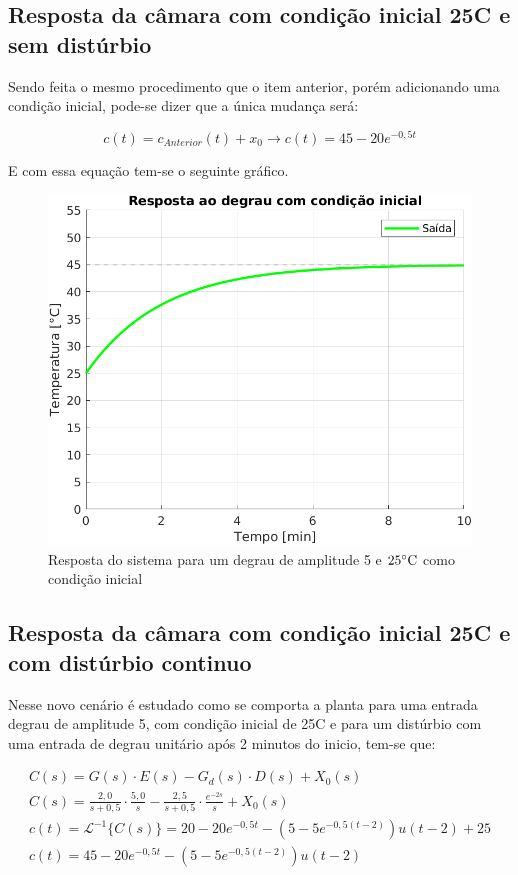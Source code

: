 \documentclass[a4paper,12pt]{article}
\begin{document}
	\subsection{Resposta da câmara com condição inicial 25\degree C e sem distúrbio}
		Sendo feita o mesmo procedimento que o item anterior, porém adicionando uma condição inicial, pode-se dizer que a única mudança será:
		
		\begin{equation}
			c(t) = c_{Anterior}(t) + x_0 \rightarrow c(t) = 45 - 20e^{-0,5t}
		\end{equation}
	
		E com essa equação tem-se o seguinte gráfico.
		
		\begin{figure}[H]
			\centering
			\includegraphics[width=0.5\linewidth]{images/respc.png}
			\caption{Resposta do sistema para um degrau de amplitude 5 e $25 \celsius$ como condição inicial}
			\label{fig:resposta_c}
		\end{figure}
	
	\subsection{Resposta da câmara com condição inicial 25\degree C e com distúrbio continuo}
		Nesse novo cenário é estudado como se comporta a planta para uma entrada degrau de amplitude 5, com condição inicial de 25\degree C e para um distúrbio com uma entrada de degrau unitário após 2 minutos do inicio, tem-se que:
		
		\begin{gather}
			C(s) = G(s) \cdot E(s) - G_d(s) \cdot D(s)  + X_0(s)\\[20pt]
			C(s) = \frac{2,0}{s+0,5} \cdot \frac{5,0}{s} - \frac{2,5}{s+0,5} \cdot \frac{e^{-2s}}{s} + X_0(s) \\[20pt]
			c(t) = \mathcal{L}^{-1} \{ C(s) \} = 20 - 20e^{-0,5t} - (5 - 5e^{-0,5(t-2)})u(t-2) + 25 \\[20pt]
			c(t) = 45 - 20e^{-0,5t} - (5 - 5e^{-0,5(t-2)})u(t-2)
		\end{gather}
	
\end{document}
